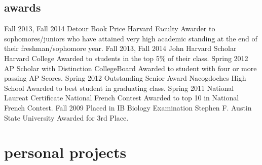 \documentclass[]{friggeri-cv} %
\begin{document}
\begin{detailed}
\section{awards}

\begin{entrylist}
\entry
{Fall 2013, Fall 2014}
{Detour Book Price}
{Harvard Faculty}
{Awarder to sophomores/juniors who have attained very high academic standing at the end of their freshman/sophomore year.}
\entry
{Fall 2013, Fall 2014}
{John Harvard Scholar}
{Harvard College}
{Awarded to students in the top 5\% of their class.}
\entry
{Spring 2012}
{AP Scholar with Distinction}
{CollegeBoard}
{Awarded to student with four or more passing AP Scores.}
\entry
{Spring 2012}
{Outstanding Senior Award}
{Nacogdoches High School}
{Awarded to best student in graduating class.}
\entry
{Spring 2011}
{National Laureat Certificate}
{National French Contest}
{Awarded to top 10 in National French Contest.}
\entry
{Fall 2009}
{Placed in IB Biology Examination}
{Stephen F. Austin State University}
{Awarded for 3rd Place.}
\end{entrylist}
\end{detailed}



\section{personal projects}
\end{document}
